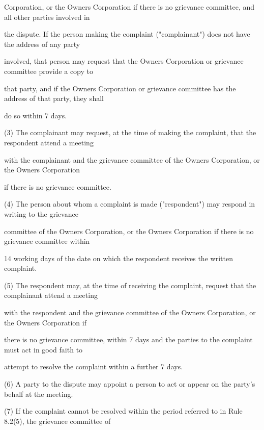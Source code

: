 \documentclass{article}
\begin{document}
{\fontsize{10.02}{1}Corporation, or the Owners Corporation if there is no grievance committee, and all other parties involved in }

{\fontsize{10.02}{1}the dispute. If the person making the complaint ("complainant") does not have the address of any party }

\newpage

{\fontsize{10.02}{1}involved, that person may request that the Owners Corporation or grievance committee provide a copy to }

{\fontsize{10.02}{1}that party, and if the Owners Corporation or grievance committee has the address of that party, they shall }

{\fontsize{10.02}{1}do so within 7 days. }

{\fontsize{9.962}{1}(3) The complainant may request, at the time of making the complaint, that the respondent attend a meeting }

{\fontsize{10.02}{1}with the complainant and the grievance committee of the Owners Corporation, or the Owners Corporation }

{\fontsize{10.02}{1}if there is no grievance committee. }

{\fontsize{9.962}{1}(4) The person about whom a complaint is made ("respondent") may respond in writing to the grievance }

{\fontsize{10.02}{1}committee of the Owners Corporation, or the Owners Corporation if there is no grievance committee within }

{\fontsize{10.02}{1}14 working days of the date on which the respondent receives the written complaint. }

{\fontsize{9.962}{1}(5) The respondent may, at the time of receiving the complaint, request that the complainant attend a meeting }

{\fontsize{10.02}{1}with the respondent and the grievance committee of the Owners Corporation, or the Owners Corporation if }

{\fontsize{10.02}{1}there is no grievance committee, within 7 days and the parties to the complaint must act in good faith to }

{\fontsize{10.02}{1}attempt to resolve the complaint within a further 7 days. }

{\fontsize{9.962}{1}(6) A party to the dispute may appoint a person to act or appear on the party’s behalf at the meeting. }

{\fontsize{9.962}{1}(7) If the complaint cannot be resolved within the period referred to in Rule 8.2(5), the grievance committee of }
\end{document}

